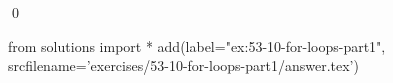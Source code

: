 
\begin{ex}
  \label{ex:53-10-for-loops-part1}
  
  \qed
\end{ex}
\begin{python0}
from solutions import *
add(label="ex:53-10-for-loops-part1",
    srcfilename='exercises/53-10-for-loops-part1/answer.tex')
\end{python0}
